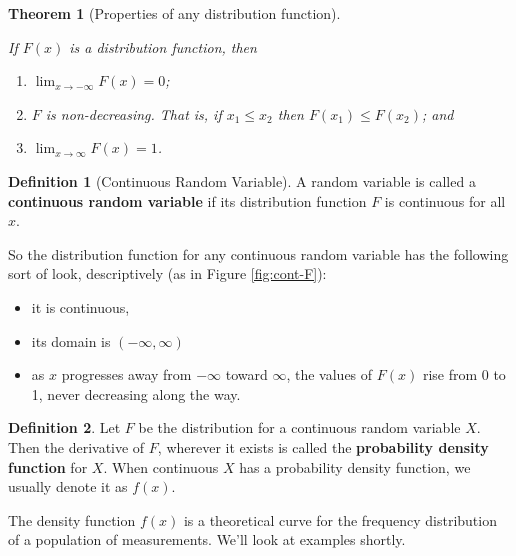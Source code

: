 \documentclass[
]{book}
\providecommand{\tightlist}{%
  \setlength{\itemsep}{0pt}\setlength{\parskip}{0pt}}
\newtheorem{theorem}{Theorem}[chapter]
\theoremstyle{definition}
\newtheorem{definition}{Definition}[chapter]
\theoremstyle{definition}
\theoremstyle{definition}
\theoremstyle{definition}
\theoremstyle{remark}
\begin{document}
\begin{theorem}[Properties of any distribution function]
\protect\hypertarget{thm:dist-fcn-props}{}\label{thm:dist-fcn-props}

If \(F(x)\) is a distribution function, then

\begin{enumerate}
\def\labelenumi{\alph{enumi})}
\tightlist
\item
  \(\displaystyle \lim_{x \to -\infty} F(x) = 0\);
\item
  \(F\) is non-decreasing. That is, if \(x_1 \leq x_2\) then \(F(x_1) \leq F(x_2)\); and
\item
  \(\displaystyle \lim_{x \to \infty} F(x) = 1\).
\end{enumerate}

\end{theorem}

\begin{definition}[Continuous Random Variable]
\protect\hypertarget{def:continuous-rv}{}\label{def:continuous-rv}A random variable is called a \textbf{continuous random variable} if its distribution function \(F\) is continuous for all \(x\).
\end{definition}

So the distribution function for any continuous random variable has the following sort of look, descriptively (as in Figure \ref{fig:cont-F}):

\begin{itemize}
\tightlist
\item
  it is continuous,
\item
  its domain is \((-\infty,\infty)\)
\item
  as \(x\) progresses away from \(-\infty\) toward \(\infty\), the values of \(F(x)\) rise from 0 to 1, never decreasing along the way.
\end{itemize}

\begin{definition}
\protect\hypertarget{def:pdf-continuous-RV}{}\label{def:pdf-continuous-RV}Let \(F\) be the distribution for a continuous random variable \(X\). Then the derivative of \(F\), wherever it exists is called the \textbf{probability density function} for \(X\). When continuous \(X\) has a probability density function, we usually denote it as \(f(x)\).
\end{definition}

The density function \(f(x)\) is a theoretical curve for the frequency distribution of a population of measurements. We'll look at examples shortly.
\end{document}
